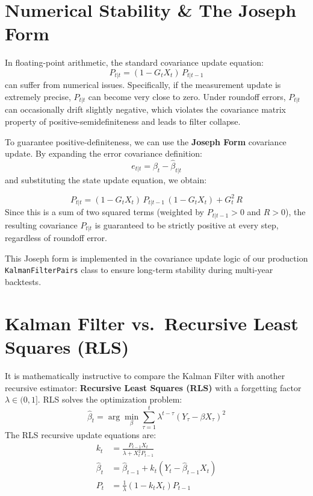 \documentclass[10pt,a4paper,twocolumn]{article}
\begin{document}
\section{Numerical Stability \& The Joseph Form}

In floating-point arithmetic, the standard covariance update equation:
\begin{equation}
  P_{t|t} = (1 - G_t X_t)\,P_{t|t-1}
\end{equation}
can suffer from numerical issues. Specifically, if the measurement update is extremely precise, $P_{t|t}$ can become very close to zero. Under roundoff errors, $P_{t|t}$ can occasionally drift slightly negative, which violates the covariance matrix property of positive-semidefiniteness and leads to filter collapse.

To guarantee positive-definiteness, we can use the \textbf{Joseph Form} covariance update. By expanding the error covariance definition:
\[
  e_{t|t} = \beta_t - \hat{\beta}_{t|t}
\]
and substituting the state update equation, we obtain:
\begin{tcolorbox}[mathbox={The Joseph Form Covariance Update}]
\begin{equation}
  P_{t|t} = (1 - G_t X_t)\,P_{t|t-1}\,(1 - G_t X_t) + G_t^2\,R
  \label{eq:joseph_form}
\end{equation}
Since this is a sum of two squared terms (weighted by $P_{t|t-1} > 0$ and $R > 0$), the resulting covariance $P_{t|t}$ is guaranteed to be strictly positive at every step, regardless of roundoff error.
\end{tcolorbox}
This Joseph form is implemented in the covariance update logic of our production \texttt{KalmanFilterPairs} class to ensure long-term stability during multi-year backtests.

\section{Kalman Filter vs.\ Recursive Least Squares (RLS)}

It is mathematically instructive to compare the Kalman Filter with another recursive estimator: \textbf{Recursive Least Squares (RLS)} with a forgetting factor $\lambda \in (0, 1]$. RLS solves the optimization problem:
\[
  \hat{\beta}_t = \arg\min_\beta \sum_{\tau=1}^t \lambda^{t-\tau} (Y_\tau - \beta X_\tau)^2
\]
The RLS recursive update equations are:
\begin{align}
  k_t &= \frac{P_{t-1} X_t}{\lambda + X_t^2 P_{t-1}} \\
  \hat{\beta}_t &= \hat{\beta}_{t-1} + k_t (Y_t - \hat{\beta}_{t-1} X_t) \\
  P_t &= \frac{1}{\lambda} (1 - k_t X_t) P_{t-1}
\end{align}
\end{document}
